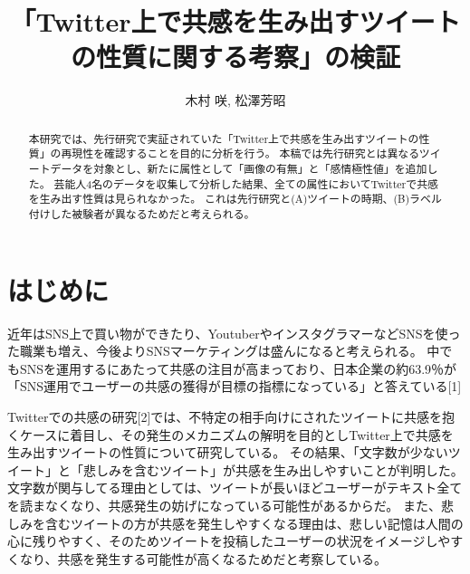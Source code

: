 \documentclass[dvipdfmx]{issj}
\title{「Twitter上で共感を生み出すツイートの性質に関する考察」の検証}
\author{木村 咲\uddag, 松澤芳昭\uddag}
\affiliation{\dag 青山学院大学　社会情報情報学部\ddag }
\begin{document}
\maketitle
\begin{abstract}
本研究では、先行研究で実証されていた「Twitter上で共感を生み出すツイートの性質」の再現性を確認することを目的に分析を行う。 本稿では先行研究とは異なるツイートデータを対象とし、新たに属性として「画像の有無」と「感情極性値」を追加した。 芸能人4名のデータを収集して分析した結果、全ての属性においてTwitterで共感を生み出す性質は見られなかった。 これは先行研究と(A)ツイートの時期、(B)ラベル付けした被験者が異なるためだと考えられる。
\end{abstract}






\section{はじめに} %

近年はSNS上で買い物ができたり、YoutuberやインスタグラマーなどSNSを使った職業も増え、今後よりSNSマーケティングは盛んになると考えられる。
中でもSNSを運用するにあたって共感の注目が高まっており、日本企業の約63.9％が「SNS運用でユーザーの共感の獲得が目標の指標になっている」と答えている[1]

Twitterでの共感の研究[2]では、不特定の相手向けにされたツイートに共感を抱くケースに着目し、その発生のメカニズムの解明を目的としTwitter上で共感を生み出すツイートの性質について研究している。
その結果、「文字数が少ないツイート」と「悲しみを含むツイート」が共感を生み出しやすいことが判明した。文字数が関与してる理由としては、ツイートが長いほどユーザーがテキスト全てを読まなくなり、共感発生の妨げになっている可能性があるからだ。
また、悲しみを含むツイートの方が共感を発生しやすくなる理由は、悲しい記憶は人間の心に残りやすく、そのためツイートを投稿したユーザーの状況をイメージしやすくなり、共感を発生する可能性が高くなるためだと考察している。
\end{document}
